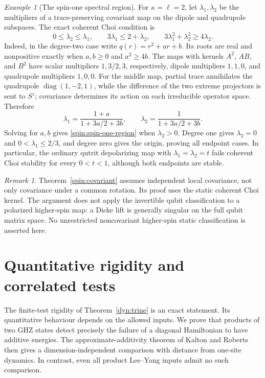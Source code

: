 \documentclass[reqno]{amsart}
\theoremstyle{definition}
\theoremstyle{remark}
\newtheorem{remark}[theorem]{Remark}
\newtheorem{example}[theorem]{Example}
\DeclareMathOperator{\diag}{diag}
\begin{document}
\begin{example}[The spin-one spectral region]\label{spin:spin-one}
For $\kappa=\ell=2$, let $\lambda_1,\lambda_2$ be the multipliers of a
trace-preserving covariant map on the dipole and quadrupole subspaces.
The exact coherent Choi condition is
\begin{equation}\label{spin:spin-one-region}
 0\leq\lambda_2\leq\lambda_1,\qquad
 3\lambda_1\leq2+\lambda_2,\qquad
 3\lambda_1^2+\lambda_2^2\geq4\lambda_2.
\end{equation}
Indeed, in the degree-two case write $q(r)=r^2+ar+b$.
Its roots are real and nonpositive exactly when
$a,b\geq0$ and $a^2\geq4b$.  The maps with kernels $A^2$, $AB$,
and $B^2$ have scalar multipliers $1,3/2,3$, respectively, dipole
multipliers $1,1,0$, and quadrupole multipliers $1,0,0$.
For the middle map, partial trace annihilates the quadrupole
$\diag(1,-2,1)$, while the difference of the two extreme projectors is
sent to $S^z$; covariance determines its action on each irreducible
operator space.  Therefore
\[
 \lambda_1=\frac{1+a}{1+3a/2+3b},\qquad
 \lambda_2=\frac1{1+3a/2+3b}.
\]
Solving for $a,b$ gives \eqref{spin:spin-one-region} when
$\lambda_2>0$.  Degree one gives
$\lambda_2=0$ and $0<\lambda_1\leq2/3$, and degree zero gives the
origin, proving all endpoint cases.  In particular, the ordinary
qutrit depolarizing map with $\lambda_1=\lambda_2=t$ fails coherent
Choi stability for every $0<t<1$, although both endpoints are stable.
\end{example}

\begin{remark}\label{spin:scope}
Theorem~\ref{spin:covariant} assumes independent local covariance, not
only covariance under a common rotation.  Its proof uses the static coherent Choi kernel.  The
argument does not apply the
invertible qubit classification to a polarized higher-spin map: a
Dicke lift is generally singular on the full qubit matrix space.
No unrestricted noncovariant higher-spin static classification is
asserted here.
\end{remark}


\section{Quantitative rigidity and correlated tests}
\label{rob:section}

The finite-test rigidity of Theorem~\ref{dyn:trine} is an exact statement.
Its quantitative behaviour depends on the allowed inputs.  We prove that
products of two GHZ states detect precisely the failure of a diagonal
Hamiltonian to have additive energies.  The approximate-additivity theorem
of Kalton and Roberts then gives a dimension-independent comparison with
distance from one-site dynamics.  In contrast, even all product Lee--Yang
inputs admit no such comparison.
\end{document}
